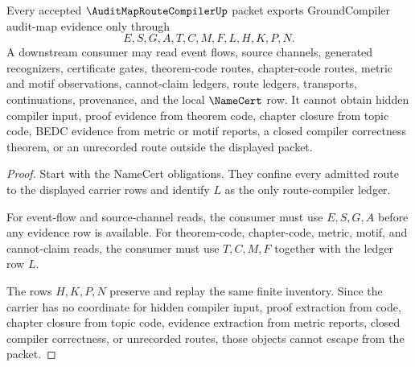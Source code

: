 \begin{theorem}
\label{thm:audit-map-route-compiler-nonescape}
Every accepted $\AuditMapRouteCompilerUp$ packet exports GroundCompiler audit-map evidence only through
$$
E,S,G,A,T,C,M,F,L,H,K,P,N.
$$
A downstream consumer may read event flows, source channels, generated recognizers, certificate gates, theorem-code routes, chapter-code routes, metric and motif observations, cannot-claim ledgers, route ledgers, transports, continuations, provenance, and the local $\NameCert$ row. It cannot obtain hidden compiler input, proof evidence from theorem code, chapter closure from topic code, BEDC evidence from metric or motif reports, a closed compiler correctness theorem, or an unrecorded route outside the displayed packet.
\end{theorem}
\begin{proof}
Start with the NameCert obligations. They confine every admitted route to the displayed carrier rows and identify $L$ as the only route-compiler ledger.

For event-flow and source-channel reads, the consumer must use $E,S,G,A$ before any evidence row is available. For theorem-code, chapter-code, metric, motif, and cannot-claim reads, the consumer must use $T,C,M,F$ together with the ledger row $L$.

The rows $H,K,P,N$ preserve and replay the same finite inventory. Since the carrier has no coordinate for hidden compiler input, proof extraction from code, chapter closure from topic code, evidence extraction from metric reports, closed compiler correctness, or unrecorded routes, those objects cannot escape from the packet.
\end{proof}

